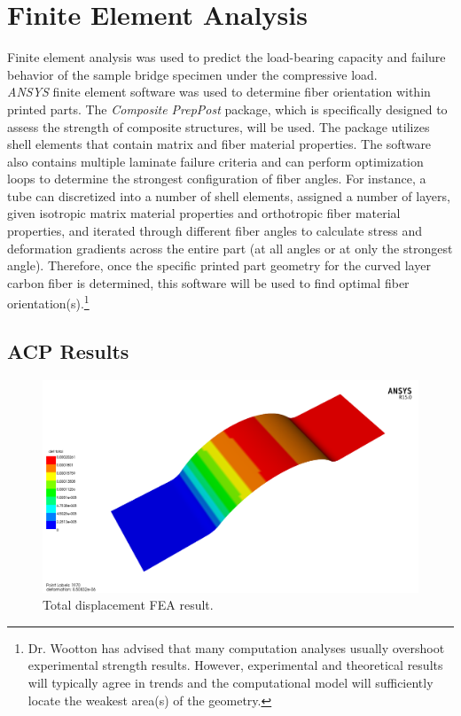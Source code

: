 \section{Finite Element Analysis}

\indent

Finite element analysis was used to predict the load-bearing capacity and failure behavior of the sample bridge specimen under the compressive load.\\

\emph{ANSYS} finite element software was used to determine fiber orientation within printed parts. The \emph{Composite PrepPost} package, which is specifically designed to assess the strength of composite structures, will be used. The package utilizes shell elements that contain matrix and fiber material properties. The software also contains multiple laminate failure criteria and can perform optimization loops to determine the strongest configuration of fiber angles. For instance, a tube can discretized into a number of shell elements, assigned a number of layers, given isotropic matrix material properties and orthotropic fiber material properties, and iterated through different fiber angles to calculate stress and deformation gradients across the entire part (at all angles or at only the strongest angle). Therefore, once the specific printed part geometry for the curved layer carbon fiber is determined, this software will be used to find optimal fiber orientation(s).\footnote{Dr. Wootton has advised that many computation analyses usually overshoot experimental strength results. However, experimental and theoretical results will typically agree in trends and the computational model will sufficiently locate the weakest area(s) of the geometry.}\\

\subsection{ACP Results}


\begin{figure}[htp]
\centering
\includegraphics[width=1\textwidth]{./figures/fea/fea-acp-tot-def}
\caption{Total displacement FEA result.}
\label{fig:fea-acp-tot-def}
\end{figure}

